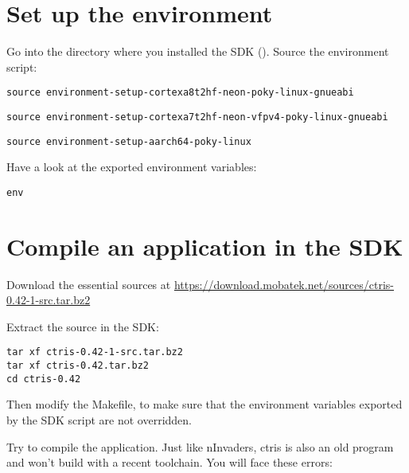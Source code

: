 \section{Set up the environment}

Go into the directory where you installed the SDK
(). Source the environment script:
\if{}
\begin{verbatim}
source environment-setup-cortexa8t2hf-neon-poky-linux-gnueabi
\end{verbatim}
\fi
\if{}
\begin{verbatim}
source environment-setup-cortexa7t2hf-neon-vfpv4-poky-linux-gnueabi
\end{verbatim}
\fi
\if{}
\begin{verbatim}
source environment-setup-aarch64-poky-linux
\end{verbatim}
\fi

Have a look at the exported environment variables:
\begin{verbatim}
env
\end{verbatim}

\section{Compile an application in the SDK}

Download the essential  sources at
\url{https://download.mobatek.net/sources/ctris-0.42-1-src.tar.bz2}

Extract the source in the SDK:
\begin{verbatim}
tar xf ctris-0.42-1-src.tar.bz2
tar xf ctris-0.42.tar.bz2
cd ctris-0.42
\end{verbatim}

Then modify the Makefile, to make sure that the environment variables exported
by the SDK script are not overridden.

Try to compile the application. Just like nInvaders, ctris is also an old
program and won't build with a recent toolchain. You will face these
errors:

